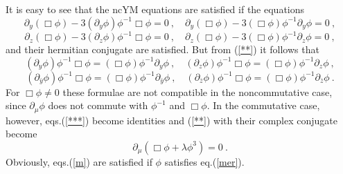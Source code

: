 \documentclass[a4paper,11pt]{article}
\numberwithin{equation}{section}
\def\l{\lambda}
\def\p{\phi}
\def\m{\mu}
\def\pa{\partial}
\newcommand{\zb}{{\bar{z}}}
\newcommand{\yb}{{\bar{y}}}
\begin{document}
It is easy to see that the ncYM equations are satisfied if the equations
$$
\pa_y(\Box\p) - 3 (\pa_y\p)\p^{-1}\Box\p = 0\ , \quad 
\pa_y(\Box\p)- 3(\Box\p)\p^{-1}\pa_y\p =0\ ,
$$ 
\begin{equation}\label{**}
\pa_z(\Box\p) - 3 (\pa_z\p)\p^{-1}\Box\p = 0\ , \quad  
\pa_z(\Box\p) - 3(\Box\p)\p^{-1}\pa_z\p  =0\ ,
\end{equation}  
and their hermitian conjugate are satisfied. But from (\ref{**}) it follows that
$$
(\pa_y\p)\p^{-1}\Box\p = (\Box\p)\p^{-1}\pa_y\p \ ,\quad 
(\pa_z\p)\p^{-1}\Box\p = (\Box\p)\p^{-1}\pa_z\p  \ ,
$$ 
\begin{equation}\label{***}
(\pa_\yb\p)\p^{-1}\Box\p = (\Box\p)\p^{-1}\pa_\yb\p \ ,\quad 
(\pa_\zb\p)\p^{-1}\Box\p = (\Box\p)\p^{-1}\pa_\zb\p  \ .
\end{equation} 
{}For $\Box\p\ne 0$ these formulae are not compatible in the noncommutative case, 
since $\pa_\m\p$ does not commute with $\p^{-1}$ and $\Box\p$. In 
the commutative case, however, eqs.(\ref{***}) become identities
and  (\ref{**}) with their complex conjugate become
\begin{equation}\label{m}
\pa_\m (\Box\p + \l\p^3) =0\ .
\end{equation}
Obviously, eqs.(\ref{m}) are satisfied if $\p$ satisfies  eq.(\ref{mer}).


\medskip
\end{document}
